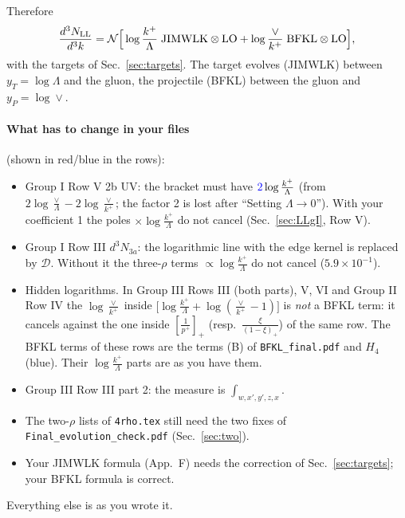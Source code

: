 \documentclass[10pt]{article}
\numberwithin{equation}{section}
\newcommand{\new}[1]{{\color{blue}#1}}
\begin{document}
Therefore
\begin{equation}
\frac{d^3N_{\rm LL}}{d^3k}=\mathcal N\Big[\log\frac{k^+}{\Lambda}\;{\rm JIMWLK}\otimes{\rm LO}+\log\frac{\vee}{k^+}\;{\rm BFKL}\otimes{\rm LO}\Big],
\label{eq:LL}
\end{equation}
with the targets of Sec.~\ref{sec:targets}. The target evolves (JIMWLK) between $y_T=\log\Lambda$ and the gluon, the projectile (BFKL) between the gluon and $y_P=\log\vee$.

\paragraph{What has to change in your files} (shown in red/blue in the rows):
\begin{itemize}
\item[E1] Group I Row V 2b UV: the bracket must have $\new{2}\log\frac{k^+}{\Lambda}$ (from $2\log\frac{\vee}{\Lambda}-2\log\frac{\vee}{k^+}$; the factor 2 is lost after ``Setting $\Lambda\to0$''). With your coefficient 1 the poles $\times\log\frac{k^+}{\Lambda}$ do not cancel (Sec.~\ref{sec:LLgI}, Row V).
\item[F3] Group I Row III $d^3N_{3a}$: the logarithmic line with the edge kernel is replaced by $\mathcal D$. Without it the three-$\rho$ terms $\propto\log\frac{k^+}{\Lambda}$ do not cancel ($5.9\times10^{-1}$).
\item[H] Hidden logarithms. In Group III Rows III (both parts), V, VI and Group II Row IV the $\log\frac{\vee}{k^+}$ inside $\big[\log\frac{k^+}{\Lambda}+\log(\frac{\vee}{k^+}-1)\big]$ is \emph{not} a BFKL term: it cancels against the one inside $\left[\frac{1}{p^+}\right]_+$ (resp.\ $\frac{\xi}{(1-\xi)_+}$) of the same row. The BFKL terms of these rows are the terms (B) of \texttt{BFKL\_final.pdf} and $H_4$ (blue). Their $\log\frac{k^+}{\Lambda}$ parts are as you have them.
\item[C5] Group III Row III part 2: the measure is $\int_{w,x',y',z,x}$.
\item[F1, F2] The two-$\rho$ lists of \texttt{4rho.tex} still need the two fixes of \texttt{Final\_evolution\_check.pdf} (Sec.~\ref{sec:two}).
\item[M2] Your JIMWLK formula (App.~F) needs the correction of Sec.~\ref{sec:targets}; your BFKL formula is correct.
\end{itemize}
Everything else is as you wrote it.
\end{document}
